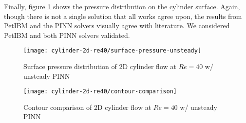 Finally, figure \ref{fig:cylinder-re40-pinn-surfp} shows the pressure distribution on the cylinder surface.
Again, though there is not a single solution that all works agree upon, the results from PetIBM and the PINN solvers visually agree with literature.
We considered PetIBM and both PINN solvers validated.

\begin{figure}
    \centering%
    \texttt{[image: cylinder-2d-re40/surface-pressure-unsteady]}%
    \caption{%
        Surface pressure distribution of 2D cylinder flow at $Re=\num{40}$ w/ unsteady PINN
    }
    \label{fig:cylinder-re40-pinn-surfp}%
\end{figure}

\begin{figure*}
    \centering%
    \texttt{[image: cylinder-2d-re40/contour-comparison]}%
    \caption{%
        Contour comparison of 2D cylinder flow at $Re=\num{40}$ w/ unsteady PINN
    }
    \label{fig:cylinder-re40-contours}%
\end{figure*}

